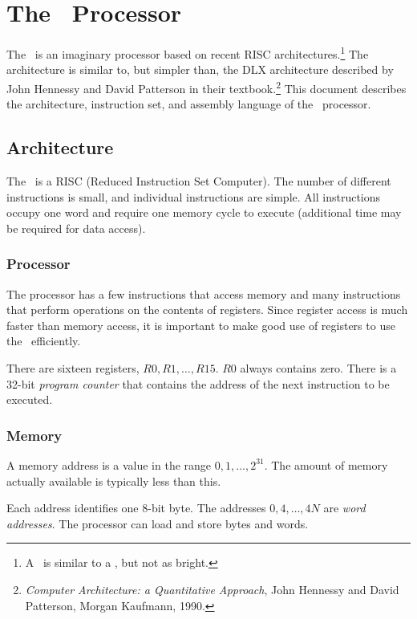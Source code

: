 \section{The \moon\ Processor}

The \moon\ is an imaginary processor based on recent RISC
architectures.\footnote{A \moon\ is similar to a \sun, but not as
bright.} The architecture is similar to, but simpler than, the DLX
architecture described by John Hennessy and David Patterson in their
textbook.\footnote{{\it Computer Architecture: a Quantitative
Approach\/}, John Hennessy and David Patterson, Morgan Kaufmann, 1990.}
This document describes the architecture, instruction set, and assembly
language of the \moon\ processor.

\subsection{Architecture}

The \moon\ is a RISC (Reduced Instruction Set Computer). The number of
different instructions is small, and individual instructions are simple.
All instructions occupy one word and require one memory cycle to execute
(additional time may be required for data access).

\subsubsection{Processor}

The processor has a few instructions that access memory and many
instructions that perform operations on the contents of registers. Since
register access is much faster than memory access, it is important to
make good use of registers to use the \moon\ efficiently.

There are sixteen registers, $R0,R1,\ldots,R15$. $R0$ always contains
zero. There is a 32-bit {\it program counter\/} that contains the
address of the next instruction to be executed.

\subsubsection{Memory}

A memory address is a value in the range $0,1,\ldots,2^{31}$. The amount
of memory actually available is typically less than this.

Each address identifies one 8-bit byte. The addresses $0,4,\ldots,4N$
are {\it word addresses\/}. The processor can load and store bytes and
words.

